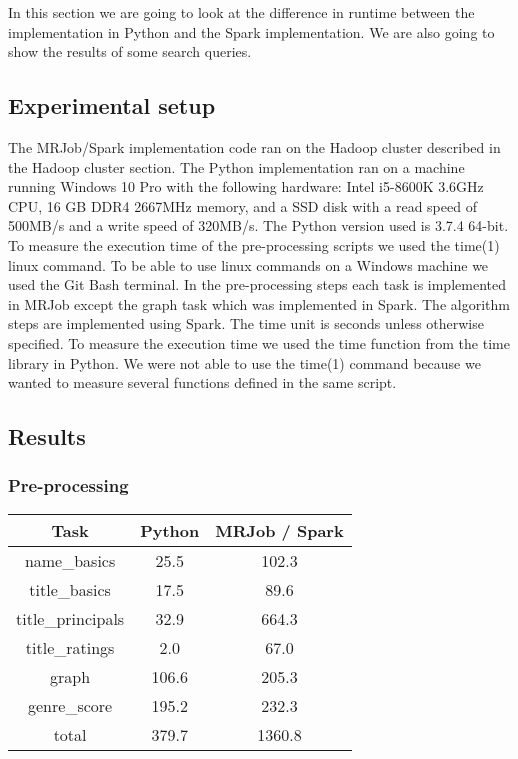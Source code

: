 In this section we are going to look at the difference in runtime between the implementation in Python and the Spark implementation. We are also going to show the results of some search queries.

\subsection{Experimental setup}
The MRJob/Spark implementation code ran on the Hadoop cluster described in the Hadoop cluster section. The Python implementation ran on a machine running Windows 10 Pro with the following hardware: Intel i5-8600K 3.6GHz CPU, 16 GB DDR4 2667MHz memory, and a SSD disk with a read speed of 500MB/s and a write speed of 320MB/s. The Python version used is 3.7.4 64-bit. To measure the execution time of the pre-processing scripts we used the time(1)\cite{Time1} linux command. To be able to use linux commands on a Windows machine we used the Git Bash terminal\cite{GitBash}. In the pre-processing steps each task is implemented in MRJob except the graph task which was implemented in Spark. The algorithm steps are implemented using Spark. The time unit is seconds unless otherwise specified. To measure the execution time we used the time function from the time library in Python. We were not able to use the time(1) command because we wanted to measure several functions defined in the same script.

\subsection{Results}
\subsubsection{Pre-processing}
\begin{center}
    \begin{tabular}{ |c|c|c| } 
        \hline
        Task & Python & MRJob / Spark \\ 
        \hline
        name\_basics & 25.5 & 102.3 \\ 
        title\_basics & 17.5 & 89.6 \\
        title\_principals & 32.9 & 664.3 \\ 
        title\_ratings & 2.0 & 67.0 \\ 
        graph & 106.6 & 205.3 \\ 
        genre\_score & 195.2 & 232.3 \\ 
        total & 379.7 & 1360.8 \\ 
        \hline
    \end{tabular}
\end{center}

